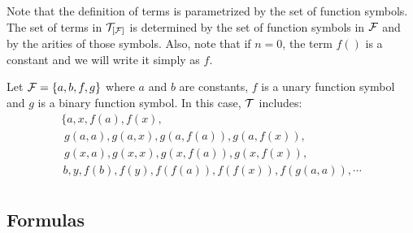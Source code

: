 \documentclass[11pt]{article}
\begin{document}
Note that the definition of terms is parametrized by the set of function
symbols.  The set of terms in ${\cal{T}}_{[{\cal{F}}]}$ is determined by the
set of function symbols in ${\cal{F}}$ and by the arities of those symbols.
Also, note that if $n = 0$, the term $f()$ is a constant
 and we will write it simply as $f$.

\example{}
{ Let ${\cal{F}}=\{a,b,f,g\}$ where $a$ and $b$ are constants, $f$ is
a unary function symbol and $g$ is a binary function symbol.  In this
case, ${\cal{T}}$ includes:
\[
\begin{array}{l}
\{a , x, f(a), f(x), \\
\; g(a,a), g(a,x), g(a,f(a)), g(a,f(x)), \\
\; g(x,a), g(x,x), g(x,f(a)), g(x,f(x)), \\
\, b, y, f(b), f(y), f(f(a)), f(f(x)), f(g(a,a)), \cdots\\
\end{array}
\]

}


\subsection{Formulas}
\end{document}
